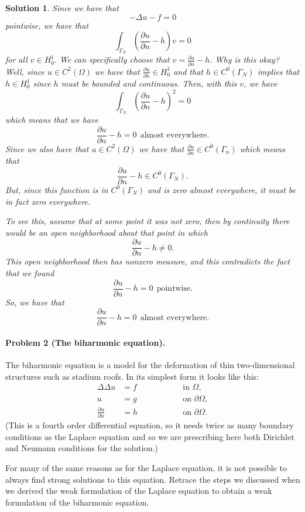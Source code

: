 \documentclass[leqno]{article}
\theoremstyle{nonumberplain}
\newtheorem{solution}{Solution}
\begin{document}
\begin{solution}
Since we have that
\[
-\Delta u - f=0
\]
pointwise, we have that
\[
\int_{\Gamma_N} \left( \frac{\partial u}{\partial n} - h\right)v =0
\]
for all $v\in H_0^1.$  We can specifically choose that $v=\frac{\partial u}{\partial n}-h$.  Why is this okay? Well, since $u\in C^2(\Omega)$ we have that $\frac{\partial u}{\partial n} \in H^1_0$ and that $h\in C^0(\Gamma_N)$ implies that $h\in H^1_0$ since $h$ must be bounded and continuous.  Then, with this $v$, we have
\[
\int_{\Gamma_N} \left(\frac{\partial u}{\partial n} - h\right)^2 = 0
\]
which means that we have 
\[
\frac{\partial u}{\partial n}-h = 0 ~~\textrm{almost everywhere.}
\]
Since we also have that $u\in C^2(\Omega)$ we have that $\frac{\partial u}{\partial n} \in C^0(\Gamma_n)$ which means that
\[
\frac{\partial u}{\partial n}-h \in C^0(\Gamma_N).
\]
But, since this function is in $C^0(\Gamma_N)$ and is zero almost everywhere, it must be in fact zero everywhere.  

To see this, assume that at some point it was not zero, then by continuity there would be an open neighborhood about that point in which 
\[
\frac{\partial u}{\partial n}-h \neq 0.
\]
This open neighborhood then has nonzero measure, and this contradicts the fact that we found 
\[
\frac{\partial u}{\partial n}-h = 0 ~~\textrm{pointwise.}
\]
So, we have that 
\[
\frac{\partial u}{\partial n}-h = 0 ~~\textrm{almost everywhere.}
\]
\end{solution}
\pagebreak



\paragraph{Problem 2 (The biharmonic equation).}
The biharmonic equation is a model for the deformation of thin
two-dimensional structures such as stadium roofs. In its simplest form
it looks like this:
\begin{align*}
  \Delta\Delta u &= f 
  \qquad\qquad && \text{in $\Omega$},
  \\
  u &= g  && \text{on $\partial\Omega$},
  \\
  \frac{\partial u}{\partial n} &= h  && \text{on $\partial\Omega$}.
\end{align*}
(This is a fourth order differential equation, so it needs twice as
many boundary conditions as the Laplace equation and so we are
prescribing here both Dirichlet and Neumann conditions for the
solution.)

For many of the same reasons as for the Laplace equation, it is not
possible to always find strong solutions to this equation. Retrace
the steps we discussed when we derived the weak formulation of the
Laplace equation to obtain a weak formulation of the biharmonic
equation.
\end{document}
